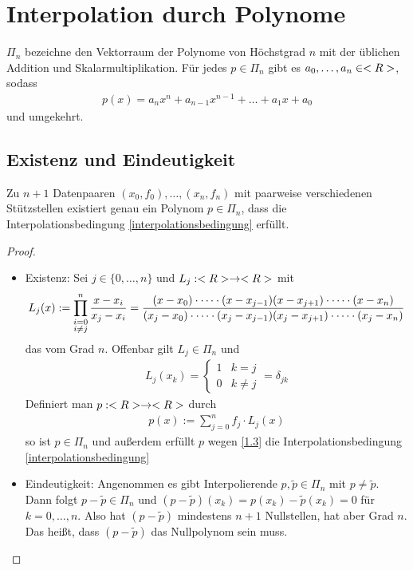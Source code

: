 \section{Interpolation durch Polynome}

$\Pi_n$ bezeichne den Vektorraum der Polynome von Höchstgrad $n$ mit der üblichen Addition und Skalarmultiplikation. Für jedes $p\in\Pi_n$ gibt es $a_0,\dots,a_n\in<R>$, sodass
\begin{align}
	\label{1.2}
	p(x) = a_nx^n+a_{n-1}x^{n-1}+\dots+a_1x+a_0
\end{align}
und umgekehrt.

\subsection{Existenz und Eindeutigkeit}

\begin{proposition}
	Zu $n+1$ Datenpaaren $(x_0,f_0),\dots,(x_n,f_n)$ mit paarweise verschiedenen Stützstellen existiert genau ein Polynom $p\in\Pi_n$, dass die Interpolationsbedingung  \cref{interpolationsbedingung} erfüllt.
\end{proposition}
\begin{proof}
	\begin{itemize}
		\item Existenz: Sei $j\in\{0,\dots,n\}$ und $L_j:<R>\to<R>$ mit
		\begin{align}
			L_j(x) := \prod_{\substack{i=0\\ i\neq j}}^{n} \frac{x-x_i}{x_j-x_i}= \frac{(x-x_0)\cdot\dots\cdot(x-x_{j-1})(x-x_{j+1})\cdot\dots\cdot(x-x_n)} {(x_j-x_0)\cdot\dots\cdot(x_j-x_{j-1})(x_j-x_{j+1})\cdot\dots\cdot(x_j-x_n)}\notag
		\end{align}
		das  vom Grad $n$. Offenbar gilt $L_j\in\Pi_n$ und 
		\begin{align}
			\label{1.3}
			L_j(x_k)=\begin{cases}
				1 & k=j \\ 0 & k\neq j
			\end{cases} = \delta_{jk}
		\end{align}
		Definiert man $p:<R>\to<R>$ durch
		\begin{align}
			\label{1.4}
			p(x) := \sum_{j=0}^{n} f_j\cdot L_j(x)
		\end{align}
		so ist $p\in\Pi_n$ und außerdem erfüllt $p$ wegen \cref{1.3} die Interpolationsbedingung \cref{interpolationsbedingung}
		\item Eindeutigkeit: Angenommen es gibt Interpolierende $p,\tilde{p}\in\Pi_n$ mit $p\neq\tilde{p}$. Dann folgt $p-\tilde{p}\in\Pi_n$ und $(p-\tilde{p})(x_k)=p(x_k)-\tilde{p}(x_k)=0$ für $k=0,\dots,n$. Also hat $(p-\tilde{p})$ mindestens $n+1$ Nullstellen, hat aber Grad $n$. Das heißt, dass $(p-\tilde{p})$ das Nullpolynom sein muss.
	\end{itemize}
\end{proof}

